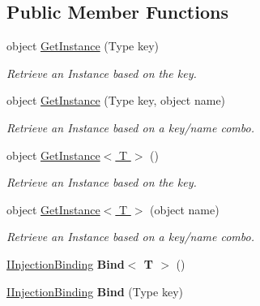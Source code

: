 \subsection*{Public Member Functions}
\begin{DoxyCompactItemize}
\item 
object \hyperlink{interfacestrange_1_1extensions_1_1injector_1_1api_1_1_i_injection_binder_a08359dc92534704919a0e9b89375db18}{Get\-Instance} (Type key)
\begin{DoxyCompactList}\small\item\em Retrieve an Instance based on the key. \end{DoxyCompactList}\item 
object \hyperlink{interfacestrange_1_1extensions_1_1injector_1_1api_1_1_i_injection_binder_aac899bd51070e8565fabab3a248cf3a5}{Get\-Instance} (Type key, object name)
\begin{DoxyCompactList}\small\item\em Retrieve an Instance based on a key/name combo. \end{DoxyCompactList}\item 
object \hyperlink{interfacestrange_1_1extensions_1_1injector_1_1api_1_1_i_injection_binder_a20bcbae77a818103c60eb063e75fd956}{Get\-Instance$<$ T $>$} ()
\begin{DoxyCompactList}\small\item\em Retrieve an Instance based on the key. \end{DoxyCompactList}\item 
object \hyperlink{interfacestrange_1_1extensions_1_1injector_1_1api_1_1_i_injection_binder_a26f141d072f219bb70513f5e21af6bbf}{Get\-Instance$<$ T $>$} (object name)
\begin{DoxyCompactList}\small\item\em Retrieve an Instance based on a key/name combo. \end{DoxyCompactList}\item 
\hypertarget{interfacestrange_1_1extensions_1_1injector_1_1api_1_1_i_injection_binder_a7faee07278ae6f408125b2f5bfe3e380}{\hyperlink{interfacestrange_1_1extensions_1_1injector_1_1api_1_1_i_injection_binding}{I\-Injection\-Binding} {\bfseries Bind$<$ T $>$} ()}\label{interfacestrange_1_1extensions_1_1injector_1_1api_1_1_i_injection_binder_a7faee07278ae6f408125b2f5bfe3e380}

\item 
\hypertarget{interfacestrange_1_1extensions_1_1injector_1_1api_1_1_i_injection_binder_afd394dfe8af8c8678ba48e7badf55f8f}{\hyperlink{interfacestrange_1_1extensions_1_1injector_1_1api_1_1_i_injection_binding}{I\-Injection\-Binding} {\bfseries Bind} (Type key)}\label{interfacestrange_1_1extensions_1_1injector_1_1api_1_1_i_injection_binder_afd394dfe8af8c8678ba48e7badf55f8f}


\end{DoxyCompactItemize}
